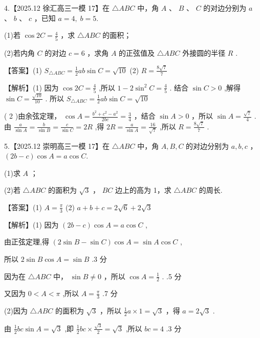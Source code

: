 \documentclass[10pt]{article}
\begin{document}
4.【2025.12 徐汇高三一模 17】在 \(\bigtriangleup {ABC}\) 中，角 \(A\) 、 \(B\) 、 \(C\) 的对边分别为 \(a\) 、 \(b\) 、 \(c\) ，已知 \(a = 4,\;b = 5.\)

(1)若 \(\cos {2C} = \frac{4}{5}\) ，求 \(\bigtriangleup  {ABC}\) 的面积；

(2)若内角 \(C\) 的对边 \(c = 6\) ，求角 \(A\) 的正弦值及 \(\bigtriangleup  {ABC}\) 外接圆的半径 \(R\) .

【答案】(1) \({S}_{\bigtriangleup {ABC}} = \frac{1}{2}{ab}\sin C = \sqrt{10}\) (2) \(R = \frac{8\sqrt{7}}{7}\)

【解析】(1) 因为 \(\cos {2C} = \frac{4}{5}\) ,所以 \(1 - 2{\sin }^{2}C = \frac{4}{5}\) . 结合 \(\sin C > 0\) ,解得 \(\sin C = \frac{\sqrt{10}}{10}\) . 所以 \({S}_{\bigtriangleup {ABC}} = \frac{1}{2}{ab}\sin C = \sqrt{10}\)

( 2 )由余弦定理， \(\cos A = \frac{{b}^{2} + {c}^{2} - {a}^{2}}{2bc} = \frac{3}{4}\) ，结合 \(\sin A > 0\) ，所以 \(\sin A = \frac{\sqrt{7}}{4}\) . 由 \(\frac{a}{\sin A} = \frac{b}{\sin B} = \frac{c}{\sin C} = {2R}\) ,得 \({2R} = \frac{a}{\sin A} = \frac{16}{\sqrt{7}}\) ,所以 \(R = \frac{8\sqrt{7}}{7}\) .

5.【2025.12 崇明高三一模 17】在 \(\bigtriangleup  {ABC}\) 中，角 \(A,B,C\) 的对边分别为 \(a,b,c\) ， \(\left( {{2b} - c}\right) \cos A = a\cos C.\)

(1)求 \(A\) ；

(2)若 \(\bigtriangleup {ABC}\) 的面积为 \(\sqrt{3}\) ， \({BC}\) 边上的高为 1，求 \(\bigtriangleup {ABC}\) 的周长.

【答案】(1) \(A = \frac{\pi }{3}\) (2) \(a + b + c = 2\sqrt{6} + 2\sqrt{3}\)

【解析】(1) 因为 \(\left( {{2b} - c}\right) \cos A = a\cos C\) ,

由正弦定理,得 \(\left( {2\sin B - \sin C}\right) \cos A = \sin A\cos C\) ,

所以 \(2\sin B\cos A = \sin B\) .3 分

因为在 \(\bigtriangleup  {ABC}\) 中， \(\sin B \neq  0\) ，所以 \(\cos A = \frac{1}{2}\) . .5 分

又因为 \(0 < A < \pi\) ,所以 \(A = \frac{\pi }{3}\) .7 分

(2)因为 \(\bigtriangleup  {ABC}\) 的面积为 \(\sqrt{3}\) ，所以 \(\frac{1}{2}a \times  1 = \sqrt{3}\) ，得 \(a = 2\sqrt{3}\) .

由 \(\frac{1}{2}{bc}\sin A = \sqrt{3}\) ,即 \(\frac{1}{2}{bc} \times  \frac{\sqrt{3}}{2} = \sqrt{3}\) ,所以 \({bc} = 4\) .3 分
\end{document}
